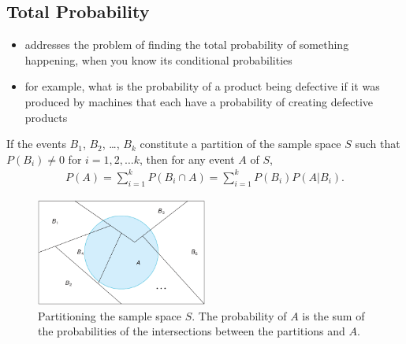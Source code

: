 \documentclass[10pt]{article}
\begin{document}
\subsection{Total Probability}
\begin{itemize}
    \item addresses the problem of finding the total probability of something happening, when you know its conditional probabilities
    \item for example, what is the probability of a product being defective if it was produced by machines that each have a probability of creating defective products
\end{itemize}
\begin{theorem}
    If the events $ B_1$, $B_2$, \ldots, $B_k$ constitute a partition of the sample space $S$ such that $P(B_i) \neq 0$ for $i = 1, 2, \ldots k$, then for any event $A$ of $S$,
    \begin{align*}
        P(A) = \sum_{i=1}^{k} P(B_i \cap A) = \sum_{i=1}^{k} P(B_i)P(A|B_i)
    .\end{align*}
\end{theorem}
\begin{figure}[h]
    \centering
    \includegraphics[width=0.5\textwidth]{totalProbability}
    \caption{Partitioning the sample space $S$. The probability of $A$ is the sum of the probabilities of the intersections between the partitions and $A$.}
    \label{fig:totalProbability}
\end{figure}
\end{document}
